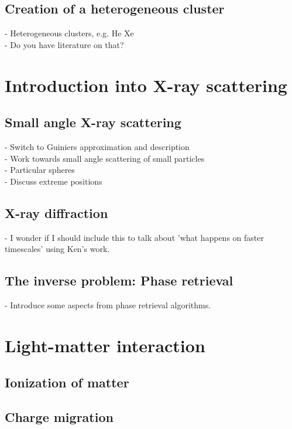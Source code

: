 %
%
%
%
%
\subsection{Creation of a heterogeneous cluster}
- Heterogeneous clusters, e.g. He Xe\\
- Do you have literature on that?
\section{Introduction into X-ray scattering}

\subsection{Small angle X-ray scattering}
- Switch to Guiniers approximation and description\\
- Work towards small angle scattering of small particles\\
- Particular spheres\\
- Discuss extreme positions
\subsection{X-ray diffraction}
- I wonder if I should include this to talk about 'what happens on faster timescales' using Ken's work.
\subsection{The inverse problem: Phase retrieval}
- Introduce some aspects from phase retrieval algorithms.
\section{Light-matter interaction}
\subsection{Ionization of matter}
\subsection{Charge migration}
